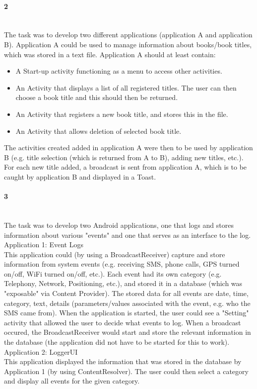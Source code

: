 \paragraph{ 2} ~\\
The task was to develop two different applications (application A and application B).
Application A could be used to manage information about books/book titles, which was stored in a text file. 
Application A should at least contain:
\begin{itemize}
	\item A Start-up activity functioning as a menu to access other activities.
	\item An Activity that displays a list of all registered titles.
	The user can then choose a book title and this should then be returned.
	\item An Activity that registers a new book title, and stores this in the file.
	\item An Activity that allows deletion of selected book title.
\end{itemize}
The activities created added in application A were then to be used by application B (e.g. title selection (which is returned from A to B), adding new titles, etc.).
For each new title added, a broadcast is sent from application A, which is to be caught by application B and displayed in a Toast.

\paragraph{ 3} ~\\
The task was to develop two Android applications, one that logs and stores information about various "events" and one that serves as an interface to the log.
\vspace{0.5em}\newline
Application 1: Event Logs \\
This application could (by using a BroadcastReceiver) capture and store information from system events (e.g. receiving SMS, phone calls, GPS turned on/off, WiFi turned on/off, etc.). 
Each event had its own category (e.g. Telephony, Network, Positioning, etc.), and stored it in a  database (which was "exposable" via Content Provider).
The stored data for all events are date, time, category, text, details (parameters/values associated with the event, e.g. who the SMS came from).
When the application is started, the user could see a "Setting" activity that allowed the user to decide what events to log.
When a broadcast occured, the BroadcastReceiver would start and store the relevant information in the database (the application did not have to be started for this to work).
\clearpage\noindent
Application 2: LoggerUI \\
This application displayed the information that was stored in the database by Application 1 (by using ContentResolver).
The user could then select a category and display all events for the given category.

